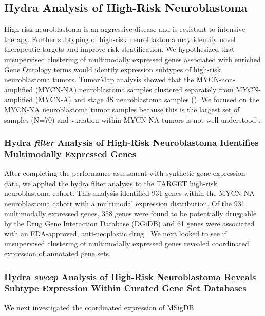 \documentclass[10pt,letterpaper]{article}
\begin{document}
\subsection{Hydra Analysis of High-Risk Neuroblastoma}
High-risk neuroblastoma is an aggressive disease and is resistant to intensive therapy. Further subtyping of high-risk neuroblastoma may identify novel therapeutic targets and improve risk stratification. We hypothesized that unsupervised clustering of multimodally expressed genes associated with enriched Gene Ontology terms would identify expression subtypes of high-risk neuroblastoma tumors. TumorMap  analysis \cite{newtonTumorMapExploringMolecular2017} showed that the MYCN-non-amplified (MYCN-NA) neuroblastoma samples clustered separately from MYCN-amplified (MYCN-A) and stage 4S neuroblastoma samples (). We focused on the MYCN-NA neuroblastoma tumor samples because this is the largest set of samples (N=70) and variation within MYCN-NA tumors is not well understood \cite{morgensternChallengeDefiningUltrahighrisk2019}.

\subsubsection{Hydra \textit{filter} Analysis of High-Risk Neuroblastoma Identifies  Multimodally Expressed Genes}
After completing the performance assessment with synthetic gene expression data, we applied the hydra filter analysis to the TARGET high-risk neuroblastoma cohort. This analysis identified 931 genes within the MYCN-NA neuroblastoma cohort with a multimodal expression distribution. Of the 931 multimodally expressed genes, 358 genes were found to be potentially druggable by the Drug Gene Interaction Database (DGiDB) and 61 genes were associated with an FDA-approved, anti-neoplastic drug  \cite{cotto2017dgidb}. We next looked to see if unsupervised clustering of multimodally expressed genes revealed coordinated expression of annotated gene sets.

\subsubsection{Hydra \textit{sweep} Analysis of High-Risk Neuroblastoma Reveals Subtype Expression Within Curated Gene Set Databases}
We next investigated the coordinated expression of MSigDB 
\end{document}
